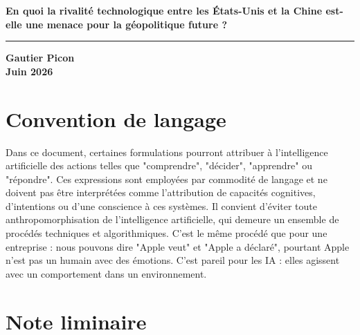 \documentclass[12pt,a4paper]{article}
\begin{document}
\sloppy

\begin{titlepage}

    \centering

    \vspace*{2cm}

    {\Huge\bfseries\color{bleu}
    En quoi la rivalité technologique entre les États-Unis et la Chine est-elle une menace pour la géopolitique future ?\par}

    \vspace{1cm}

    \rule{15cm}{0.4pt}

    \vspace{1cm}

    {\large
    \textbf{Gautier Picon}\\[0.3cm]
    \textbf{Juin 2026}
    }

\end{titlepage}

\tableofcontents
\newpage

\section*{Convention de langage}

Dans ce document, certaines formulations pourront attribuer à l'intelligence artificielle des actions telles que "comprendre", "décider", "apprendre" ou "répondre". Ces expressions sont employées par commodité de langage et ne doivent pas être interprétées comme l'attribution de capacités cognitives, d'intentions ou d'une conscience à ces systèmes. Il convient d'éviter toute anthropomorphisation de l'intelligence artificielle, qui demeure un ensemble de procédés techniques et algorithmiques. C'est le même procédé que pour une entreprise : nous pouvons dire "Apple veut" et "Apple a déclaré", pourtant Apple n'est pas un humain avec des émotions. C'est pareil pour les IA : elles agissent avec un comportement dans un environnement.

\section*{Note liminaire}
\end{document}
